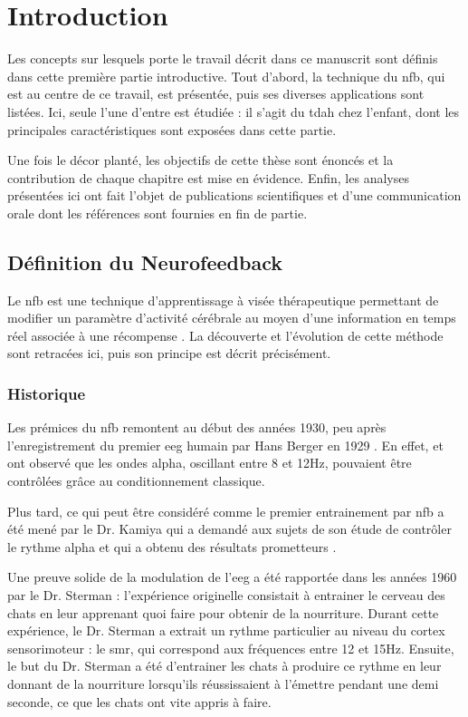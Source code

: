 \chapter{Introduction} \label{chapitre-1}

Les concepts sur lesquels porte le travail décrit dans ce manuscrit sont définis dans cette première partie introductive. Tout d'abord, la technique du \gls{nfb}, 
qui est au centre de ce travail, est présentée, puis ses diverses applications sont listées. Ici, seule l'une d'entre est étudiée : il s'agit du \gls{tdah}
chez l'enfant, dont les principales caractéristiques sont exposées dans cette partie. 

Une fois le décor planté, les objectifs de cette thèse sont énoncés et la contribution de chaque chapitre est mise en évidence. Enfin, les analyses présentées 
ici ont fait l'objet de publications scientifiques et d'une communication orale dont les références sont fournies en fin de partie.  

\section{Définition du Neurofeedback}

Le \gls{nfb} est une technique d’apprentissage à visée thérapeutique permettant de modifier un paramètre d’activité cérébrale au moyen d’une 
information en temps réel associée à une récompense \citep{Arns2014}. 
La découverte et l'évolution de cette méthode sont retracées ici, puis son principe est décrit précisément.

\subsection{Historique}

Les prémices du \gls{nfb} remontent au début des années 1930, peu après l'enregistrement du premier \gls{eeg} humain par Hans Berger en 1929 \citep{Berger1929}.
En effet, \citet{Durup1935} et \citet{Loomis1936} ont observé que les ondes alpha, oscillant entre 8 et 12Hz, pouvaient être contrôlées grâce au 
conditionnement classique. 

Plus tard, ce qui peut être considéré comme le premier entrainement par \gls{nfb} a été mené par le Dr. Kamiya qui a demandé aux sujets de son étude 
de contrôler le rythme alpha et qui a obtenu des résultats prometteurs \citep{Kamiya1969}. 

Une preuve solide de la modulation de l'\gls{eeg} a été rapportée dans les années 1960 par le Dr. Sterman : l'expérience 
originelle consistait à entrainer le cerveau des chats en leur apprenant quoi faire pour obtenir de 
la nourriture. Durant cette expérience, le Dr. Sterman a extrait un rythme particulier au niveau du cortex sensorimoteur : le \gls{smr}, qui correspond 
aux fréquences entre 12 et 15Hz. Ensuite, le but du Dr. Sterman a été d'entrainer les chats à produire ce rythme en leur donnant de la nourriture 
lorsqu'ils réussissaient à l'émettre pendant une demi seconde, ce que les chats ont vite appris à faire. 


